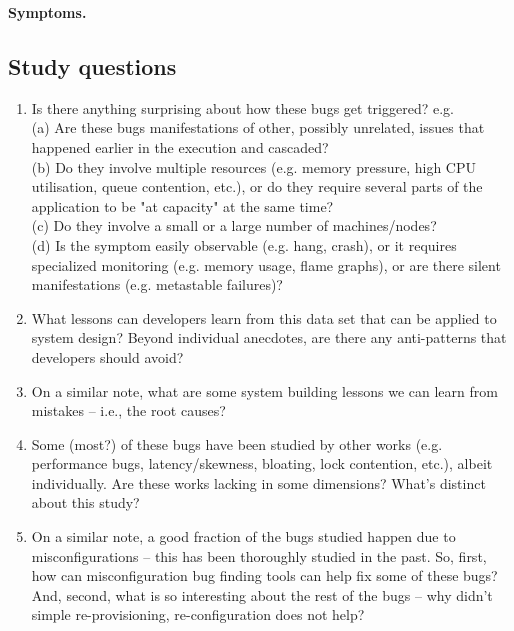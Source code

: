 \vspace{.05in}
\noindent
\textbf{Symptoms.}


\subsection{Study questions}

\begin{enumerate}
    \item Is there anything surprising about how these bugs get triggered? e.g. 
    \\ (a) Are these bugs manifestations of other, possibly unrelated, issues that happened earlier in the execution and cascaded? 
    \\ (b) Do they involve multiple resources (e.g. memory pressure, high CPU utilisation, queue contention, etc.), or do they require several parts of the application to be "at capacity" at the same time? 
    \\ (c) Do they involve a small or a large number of machines/nodes? 
    \\ (d) Is the symptom easily observable (e.g. hang, crash), or it requires specialized monitoring (e.g. memory usage, flame graphs), or are there silent manifestations (e.g. metastable failures)?  
    \item What lessons can developers learn from this data set that can be applied to system design? Beyond individual anecdotes, are there any anti-patterns that developers should avoid?
    \item On a similar note, what are some system building lessons we can learn from mistakes -- i.e., the root causes?
    \item Some (most?) of these bugs have been studied by other works (e.g. performance bugs, latency/skewness, bloating, lock contention, etc.), albeit individually. Are these works lacking in some dimensions? What's distinct about this study?
    \item On a similar note, a good fraction of the bugs studied happen due to misconfigurations -- this has been thoroughly studied in the past. So, first, how can misconfiguration bug finding tools can help fix some of these bugs? And, second, what is so interesting about the rest of the bugs -- why didn't simple re-provisioning, re-configuration does not help?
\end{enumerate}
